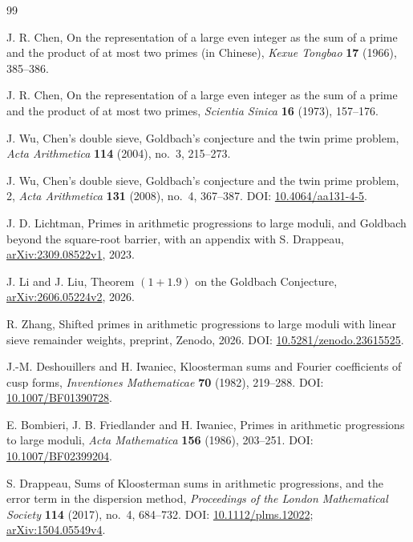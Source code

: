 \begin{thebibliography}{99}

 J. R. Chen,
On the representation of a large even integer as the sum of a prime and
the product of at most two primes (in Chinese),
\emph{Kexue Tongbao} \textbf{17} (1966), 385--386.

 J. R. Chen,
On the representation of a large even integer as the sum of a prime and
the product of at most two primes,
\emph{Scientia Sinica} \textbf{16} (1973), 157--176.

 J. Wu,
Chen's double sieve, Goldbach's conjecture and the twin prime problem,
\emph{Acta Arithmetica} \textbf{114} (2004), no.~3, 215--273.

 J. Wu,
Chen's double sieve, Goldbach's conjecture and the twin prime problem, 2,
\emph{Acta Arithmetica} \textbf{131} (2008), no.~4, 367--387.
DOI: \href{https://doi.org/10.4064/aa131-4-5}{10.4064/aa131-4-5}.

 J. D. Lichtman,
Primes in arithmetic progressions to large moduli, and Goldbach beyond
the square-root barrier, with an appendix with S. Drappeau,
\href{https://arxiv.org/abs/2309.08522v1}{arXiv:2309.08522v1}, 2023.

 J. Li and J. Liu,
Theorem $(1+1.9)$ on the Goldbach Conjecture,
\href{https://arxiv.org/abs/2606.05224v2}{arXiv:2606.05224v2}, 2026.

 R. Zhang,
Shifted primes in arithmetic progressions to large moduli with linear sieve remainder weights,
preprint, Zenodo, 2026.
DOI: \href{https://doi.org/10.5281/zenodo.23615525}{10.5281/zenodo.23615525}.

 J.-M. Deshouillers and H. Iwaniec,
Kloosterman sums and Fourier coefficients of cusp forms,
\emph{Inventiones Mathematicae} \textbf{70} (1982), 219--288.
DOI: \href{https://doi.org/10.1007/BF01390728}{10.1007/BF01390728}.

 E. Bombieri, J. B. Friedlander and H. Iwaniec,
Primes in arithmetic progressions to large moduli,
\emph{Acta Mathematica} \textbf{156} (1986), 203--251.
DOI: \href{https://doi.org/10.1007/BF02399204}{10.1007/BF02399204}.

 S. Drappeau,
Sums of Kloosterman sums in arithmetic progressions, and the error term
in the dispersion method,
\emph{Proceedings of the London Mathematical Society} \textbf{114}
(2017), no.~4, 684--732.
DOI: \href{https://doi.org/10.1112/plms.12022}{10.1112/plms.12022};
\href{https://arxiv.org/abs/1504.05549v4}{arXiv:1504.05549v4}.


\end{thebibliography}
